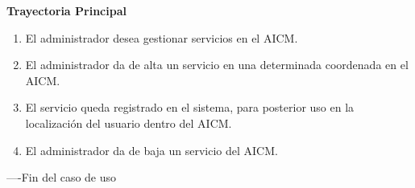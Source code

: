 \begin{flushleft}
	\textbf{Trayectoria Principal}\\
	\begin{enumerate}
		\item El administrador desea gestionar servicios en el AICM.
		\item El administrador da de alta un servicio en una determinada coordenada en el AICM.
		\item El servicio queda registrado en el sistema, para posterior uso en la localización del usuario dentro del AICM.
		\item El administrador da de baja un servicio del AICM.
	\end{enumerate}
\end{flushleft}
----Fin del caso de uso
\clearpage